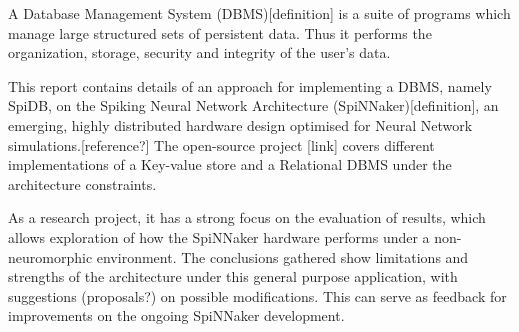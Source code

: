 A Database Management System (DBMS)[definition] is a suite of programs which manage large structured sets of persistent data.\cite{dbmsdef} Thus it performs the organization, storage, security and integrity of the user's data.

This report contains details of an approach for implementing a DBMS, namely SpiDB, on the Spiking Neural Network Architecture (SpiNNaker)[definition], an emerging, highly distributed hardware design optimised for Neural Network simulations.[reference?] The open-source project [link] covers different implementations of a Key-value store and a Relational DBMS under the architecture constraints.

As a research project, it has a strong focus on the evaluation of results, which allows exploration of how the SpiNNaker hardware performs under a non-neuromorphic environment. The conclusions gathered show limitations and strengths of the architecture under this general purpose application, with suggestions (proposals?) on possible modifications. This can serve as feedback for improvements on the ongoing SpiNNaker development.